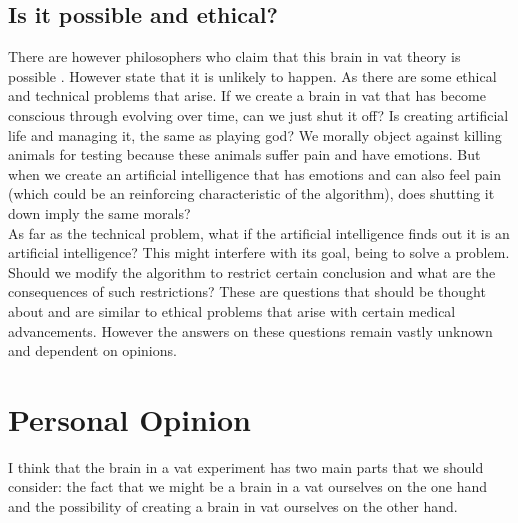 \documentclass[a4paper]{article}
\begin{document}
\subsection{Is it possible and ethical?}
There are however philosophers who claim that this brain in vat theory is possible \cite{IsPossible}. However state that it is unlikely to happen. As there are some ethical and technical problems that arise. If we create a brain in vat that has become conscious through evolving over time, can we just shut it off? Is creating artificial life and managing it, the same as playing god? We morally object against killing animals for testing because these animals suffer pain and have emotions. But when we create an artificial intelligence that has emotions and can also feel pain (which could be an reinforcing characteristic of the algorithm), does shutting it down imply the same morals?\\
As far as the technical problem, what if the artificial intelligence finds out it is an artificial intelligence? This might interfere with its goal, being to solve a problem. Should we modify the algorithm to restrict certain conclusion and what are the consequences of such restrictions? These are questions that should be thought about and are similar to ethical problems that arise with certain medical advancements. However the answers on these questions remain vastly unknown and dependent on opinions.

\section{Personal Opinion}
I think that the brain in a vat experiment has two main parts that we should consider: the fact that we might be a brain in a vat ourselves on the one hand and the possibility of creating a brain in vat ourselves on the other hand.\\
\end{document}
